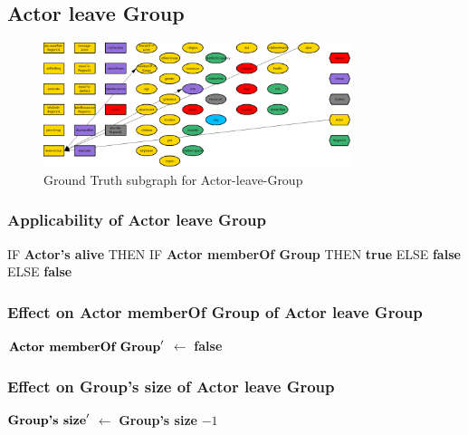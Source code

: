 \documentclass{article}%
\begin{document}
%
\subsection{Actor leave Group}%
\label{subsec:Actor leave Group}%


\begin{figure}[ht]%
\centering%
\includegraphics[width=0.8\textwidth]{images/Actor-leave-Group.png}%
\caption{Ground Truth subgraph for Actor{-}leave{-}Group}%
\end{figure}

%
\subsubsection{Applicability of Actor leave Group}%
\label{ssubsec:Applicability of Actor leave Group}%
\begin{flushleft}%
IF %
\textbf{Actor's alive}%
\linebreak%
\hspace*{2em}%
THEN %
IF %
\textbf{Actor memberOf Group}%
\linebreak%
\hspace*{4em}%
THEN %
\textbf{true}%
\linebreak%
\hspace*{4em}%
ELSE %
\textbf{false}%
\linebreak%
\hspace*{2em}%
ELSE %
\textbf{false}%
\end{flushleft}

%
\subsubsection{Effect on Actor memberOf Group of Actor leave Group}%
\label{ssubsec:Effect on Actor memberOf Group of Actor leave Group}%
\begin{flushleft}%
$\mbox{\textbf{Actor memberOf Group}} '$%
$\leftarrow$%
\textbf{false}%
\end{flushleft}

%
\subsubsection{Effect on Group's size of Actor leave Group}%
\label{ssubsec:Effect on Group's size of Actor leave Group}%
\begin{flushleft}%
$\mbox{\textbf{Group's size}} '$%
$\leftarrow$%
\textbf{Group's size}%
${-}1$%
\end{flushleft}
\end{document}

